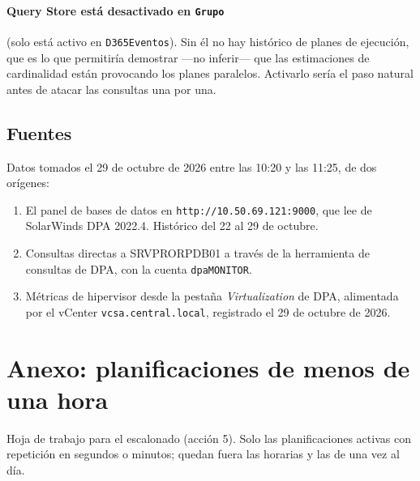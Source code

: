 \documentclass[11pt,a4paper]{article}
\newcommand{\cod}[1]{\texttt{\small #1}}
\begin{document}
\paragraph{Query Store está desactivado en \cod{Grupo}} (solo está activo en
\cod{D365Eventos}). Sin él no hay histórico de planes de ejecución, que es lo
que permitiría demostrar —no inferir— que las estimaciones de cardinalidad
están provocando los planes paralelos. Activarlo sería el paso natural antes
de atacar las consultas una por una.

\subsection*{Fuentes}

Datos tomados el 29 de octubre de 2026 entre las 10:20 y las 11:25, de dos
orígenes:

\begin{enumerate}
  \item El panel de bases de datos en \cod{http://10.50.69.121:9000},
        que lee de SolarWinds DPA 2022.4. Histórico del 22 al 29 de octubre.
  \item Consultas directas a SRVPRORPDB01 a través de la herramienta de
        consultas de DPA, con la cuenta \cod{dpaMONITOR}.
  \item Métricas de hipervisor desde la pestaña \emph{Virtualization} de DPA,
        alimentada por el vCenter \cod{vcsa.central.local}, registrado el
        29 de octubre de 2026.
\end{enumerate}

\newpage
\section{Anexo: planificaciones de menos de una hora}

Hoja de trabajo para el escalonado (acción 5). Solo las planificaciones
activas con repetición en segundos o minutos; quedan fuera las horarias y las
de una vez al día.
\end{document}
